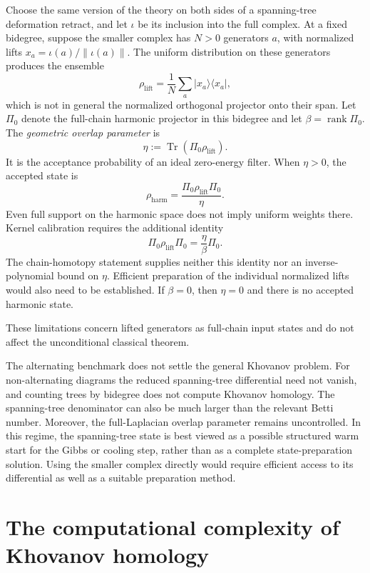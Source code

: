 \documentclass[a4paper,onecolumn,unpublished]{quantumarticle}
\theoremstyle{plain}
\theoremstyle{definition}
\theoremstyle{definition}
\numberwithin{equation}{section}
\begin{document}
Choose the same version of the theory on both sides of a spanning-tree deformation retract, and let \(\iota\) be its inclusion into the full complex. At a fixed bidegree, suppose the smaller complex has \(N>0\) generators \(a\), with normalized lifts \(x_a=\iota(a)/\|\iota(a)\|\). The uniform distribution on these generators produces the ensemble
\[
 \rho_{\mathrm{lift}}=\frac1N\sum_a|x_a\rangle\langle x_a|,
\]
which is not in general the normalized orthogonal projector onto their span. Let \(\Pi_0\) denote the full-chain harmonic projector in this bidegree and let \(\beta=\operatorname{rank}\Pi_0\). The \emph{geometric overlap parameter} is
\begin{equation}
 \eta:=\operatorname{Tr}(\Pi_0\rho_{\mathrm{lift}}).
 \label{eq:tree-geometric-overlap}
\end{equation}
It is the acceptance probability of an ideal zero-energy filter. When \(\eta>0\), the accepted state is
\[
 \rho_{\mathrm{harm}}
 =\frac{\Pi_0\rho_{\mathrm{lift}}\Pi_0}{\eta}.
\]
Even full support on the harmonic space does not imply uniform weights there. Kernel calibration requires the additional identity
\[
 \Pi_0\rho_{\mathrm{lift}}\Pi_0=\frac{\eta}{\beta}\Pi_0 .
\]
The chain-homotopy statement supplies neither this identity nor an inverse-polynomial bound on \(\eta\). Efficient preparation of the individual normalized lifts would also need to be established. If \(\beta=0\), then \(\eta=0\) and there is no accepted harmonic state.

These limitations concern lifted generators as full-chain input states and do not affect the unconditional classical theorem.

The alternating benchmark does not settle the general Khovanov problem. For non-alternating diagrams the reduced spanning-tree differential need not vanish, and counting trees by bidegree does not compute Khovanov homology. The spanning-tree denominator can also be much larger than the relevant Betti number. Moreover, the full-Laplacian overlap parameter remains uncontrolled. In this regime, the spanning-tree state is best viewed as a possible structured warm start for the Gibbs or cooling step, rather than as a complete state-preparation solution. Using the smaller complex directly would require efficient access to its differential as well as a suitable preparation method.


\section{The computational complexity of Khovanov homology}
\label{sec:complexity}
\end{document}
